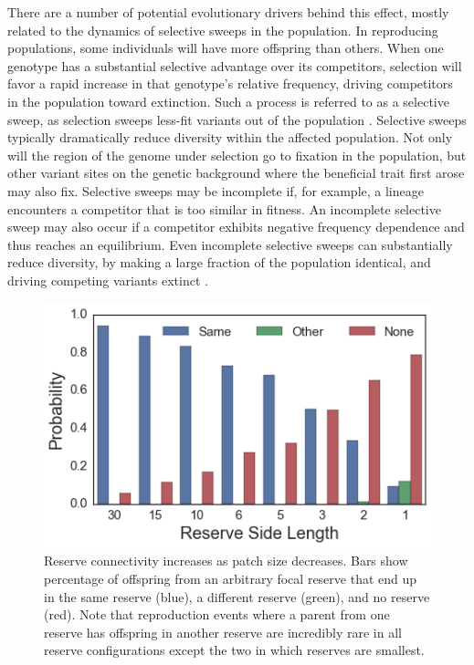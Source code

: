 \documentclass[letterpaper]{article}
\begin{document}
There are a number of potential evolutionary drivers behind this effect, mostly related to the dynamics of selective sweeps in the population. In reproducing populations, some individuals will have more offspring than others.  When one genotype has a substantial selective advantage over its competitors, selection will favor a rapid increase in that genotype's relative frequency, driving competitors in the population toward extinction.  Such a process is referred to as a selective sweep, as selection sweeps less-fit variants out of the population \citep{mcvean_structure_2007}.  Selective sweeps typically dramatically reduce diversity within the affected population.  Not only will the region of the genome under selection go to fixation in the population, but other variant sites on the genetic background where the beneficial trait first arose may also fix.  Selective sweeps may be incomplete if, for example, a lineage encounters a competitor that is too similar in fitness. An incomplete selective sweep may also occur if a competitor exhibits negative frequency dependence and thus reaches an equilibrium.  Even incomplete selective sweeps can substantially reduce diversity, by making a large fraction of the population identical, and driving competing variants extinct \citep{biswas_genomic_2006}.
%
%
%
\begin{figure}[h]
	\centering
	\includegraphics[width=\linewidth]{Connectivity.png}
    \caption{Reserve connectivity increases as patch size decreases. Bars show percentage of offspring from an arbitrary focal reserve that end up in the same reserve (blue), a different reserve (green), and no reserve (red). Note that reproduction events where a parent from one reserve has offspring in another reserve are incredibly rare in all reserve configurations except the two in which reserves are smallest.}
    \label{fig:connectivity}
\end{figure}
\end{document}
